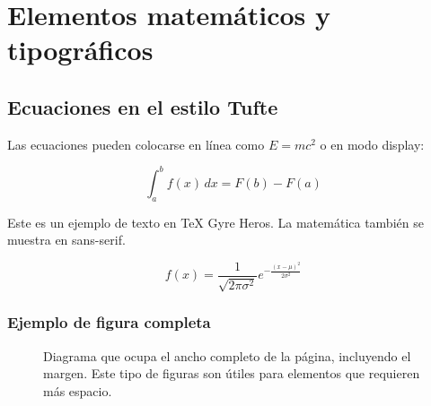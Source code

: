
\chapter{Elementos matemáticos y tipográficos}

\section{Ecuaciones en el estilo Tufte}

Las ecuaciones pueden colocarse en línea como \(E = mc^2\) o en modo display:

\begin{equation}
\int_a^b f(x)\,dx = F(b) - F(a)
\end{equation}

Este es un ejemplo de texto en TeX Gyre Heros. La matemática también se muestra en sans-serif.

\[ f(x) = \frac{1}{\sqrt{2\pi\sigma^2}} e^{-\frac{(x-\mu)^2}{2\sigma^2}} \]

\subsection{Ejemplo de figura completa}

\begin{figure*}[ht]\centering
\caption{Diagrama que ocupa el ancho completo de la página, incluyendo el margen. Este tipo de figuras son útiles para elementos que requieren más espacio.}
\label{fig:diagrama-completo}
\end{figure*}

\lipsum[1-10] %
